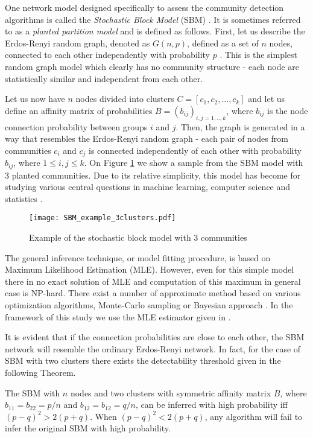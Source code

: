 One network model designed specifically to assess the community detection algorithms is called the \textit{Stochastic Block Model} (SBM) \cite{Abbe2018}. It is sometimes referred to as a \textit{planted partition model} and is defined as follows. First, let us describe the Erdos-Renyi random graph, denoted as $G(n,p)$, defined as a set of $n$ nodes, connected to each other independently with probability $p$ \cite{ErdosRenyi1959}. This is the simplest random graph model which clearly has no community structure - each node are statistically similar and independent from each other. 

Let us now have $n$ nodes divided into clusters $C=[c_1,c_2,\dots ,c_k]$ and let us define an affinity matrix of probabilities $B=(b_{ij})_{i,j=1,..,k}$, where  $b_{ij}$ is the node connection probability between groups $i$ and $j$. Then, the graph is generated in a way that resembles the Erdos-Renyi random graph - each pair of nodes from communities $c_i$ and $c_j$ is connected independently of each other with probability $b_{ij}$, where $1\leq i,j\leq k$. On Figure \ref{fig:sbm_example} we show a sample from the SBM model with 3 planted communities. Due to its relative simplicity, this model has become for studying various central questions in machine learning, computer science and statistics \cite{Moore2017}. 

 \begin{figure}[ht]
 \centering
    \texttt{[image: SBM\_example\_3clusters.pdf]}
   \caption{Example of the stochastic block model with 3 communities}
   \label{fig:sbm_example}
 \end{figure}

The general inference technique, or model fitting procedure, is based on Maximum Likelihood Estimation (MLE). However, even for this simple model there in no exact solution of MLE and computation of this maximum in general case is NP-hard. There exist a number of approximate method based on various optimization algorithms, Monte-Carlo sampling or Bayesian approach \cite{BrianNewman2011}. In the framework of this study we use the MLE estimator given in \cite{Peixoto2014}. 

It is evident that if the connection probabilities are close to each other, the SBM network will resemble the ordinary Erdos-Renyi network. In fact, for the case of SBM with two clusters there exists the detectability threshold given in the following Theorem.
\begin{theorem}\label{thm.detectability_SBM}
The SBM with $n$ nodes and two clusters with symmetric affinity matrix $B$, where $b_{11}=b_{22}=p/n$ and $b_{12}=b_{12}=q/n$, can be inferred with high probability iff $(p-q)^2> 2(p+q)$. When $(p-q)^2 < 2(p+q)$, any algorithm will fail to infer the original SBM with high probability. 
\end{theorem}

